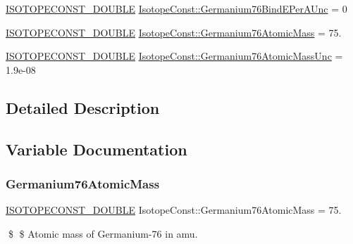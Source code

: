 \begin{DoxyCompactItemize}
\mbox{\hyperlink{group___isotope_const-_macros_ga8f45a7272ce02c0b4c65c44636ed719a}{I\+S\+O\+T\+O\+P\+E\+C\+O\+N\+S\+T\+\_\+\+D\+O\+U\+B\+LE}} \mbox{\hyperlink{group___isotope_const-_germanium-_ge76_ga8ebb41d19e44f9b6cc7dbbe096d93d19}{Isotope\+Const\+::\+Germanium76\+Bind\+E\+Per\+A\+Unc}} = 0
\item 
\mbox{\hyperlink{group___isotope_const-_macros_ga8f45a7272ce02c0b4c65c44636ed719a}{I\+S\+O\+T\+O\+P\+E\+C\+O\+N\+S\+T\+\_\+\+D\+O\+U\+B\+LE}} \mbox{\hyperlink{group___isotope_const-_germanium-_ge76_gae6a996c64e3d16c225fea8adbf325861}{Isotope\+Const\+::\+Germanium76\+Atomic\+Mass}} = 75.
\item 
\mbox{\hyperlink{group___isotope_const-_macros_ga8f45a7272ce02c0b4c65c44636ed719a}{I\+S\+O\+T\+O\+P\+E\+C\+O\+N\+S\+T\+\_\+\+D\+O\+U\+B\+LE}} \mbox{\hyperlink{group___isotope_const-_germanium-_ge76_ga62d5355d39767c706c31b013ed60c1b5}{Isotope\+Const\+::\+Germanium76\+Atomic\+Mass\+Unc}} = 1.\+9e-\/08
\end{DoxyCompactItemize}


\subsection{Detailed Description}


\subsection{Variable Documentation}
\mbox{\label{group___isotope_const-_germanium-_ge76_gae6a996c64e3d16c225fea8adbf325861}} 
\subsubsection{\texorpdfstring{Germanium76\+Atomic\+Mass}{Germanium76AtomicMass}}
{\footnotesize\ttfamily \mbox{\hyperlink{group___isotope_const-_macros_ga8f45a7272ce02c0b4c65c44636ed719a}{I\+S\+O\+T\+O\+P\+E\+C\+O\+N\+S\+T\+\_\+\+D\+O\+U\+B\+LE}} Isotope\+Const\+::\+Germanium76\+Atomic\+Mass = 75.}

\$ \$ Atomic mass of Germanium-\/76 in amu. \mbox{\label{group___isotope_const-_germanium-_ge76_ga62d5355d39767c706c31b013ed60c1b5}} 
